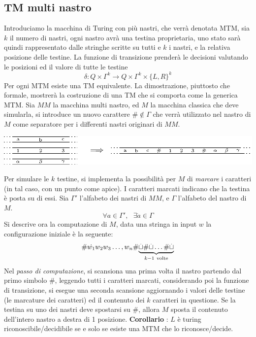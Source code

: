 \documentclass[10pt, letterpaper]{report}
\begin{document}
\subsection{TM multi nastro}
Introduciamo la macchina di Turing con più nastri, che verrà 
denotata MTM, 
sia $k$ il numero di nastri, ogni nastro avrà 
una testina proprietaria, uno stato sarà quindi rappresentato 
dalle stringhe scritte su tutti e $k$ i nastri, e la relativa 
posizione delle testine. \acc 
La funzione di transizione prenderà le decisioni valutando le posizioni 
ed il valore di tutte le testine 
$$ \delta : Q\times\Gamma^k\rightarrow Q\times\Gamma^k\times \{L,R\}^k$$
 Per ogni MTM esiste una TM equivalente.\acc 
\dimo{} La dimostrazione, piuttosto che formale, mostrerà la costruzione di una 
TM che si comporta come la generica MTM.\acc 
Sia $MM$ la macchina multi nastro, ed $M$ la macchina classica 
 che deve simularla, si introduce un nuovo carattere $\#\notin \Gamma$
 che verrà utilizzato nel nastro di $M$ come separatore per i 
differenti nastri originari di $MM$.\begin{center}
    \includegraphics[width=\textwidth ]{images/multinastro.eps}
\end{center}
Per simulare le $k$ testine, si implementa la possibilità per $M$ 
di \textit{marcare} i caratteri (in tal caso, con un punto come 
apice). I caratteri marcati indicano che la testina è posta su di essi. Sia $\Gamma'$ l'alfabeto dei nastri di $MM$, e 
$\Gamma$ l'alfabeto del nastro di $M$.
$$\forall a\in\Gamma', \ \ \ \exists \dot{a} \in\Gamma$$
Si descrive ora la computazione di $M$, data una stringa 
in input $w$ la configurazione iniziale è la seguente: 
$$\#\dot{w_1}w_2w_3\dots,w_n\# 
\smash{\underbrace{\dot{\blank}\#\dot{\blank}\dots \#\dot{\blank}}_{k-1\ \text{volte}}}
$$
\\ 
Nel \textit{passo di computazione}, 
si scansiona una prima volta il nastro 
partendo dal primo simbolo $\#$, leggendo tutti i 
caratteri marcati, considerando poi la funzione di 
transizione, si esegue una seconda scansione aggiornando i 
valori delle testine (le marcature dei caratteri) ed il contenuto 
dei $k$ caratteri in questione. Se la testina su uno dei nastri deve 
spostarsi su $\#$, allora $M$ sposta il contenuto dell'intero nastro a destra di 1 posizione.\acc 
\textbf{Corollario} : $L$ è turing riconoscibile/decidibile se e solo se esiste una MTM che lo riconosce/decide.
\end{document}
